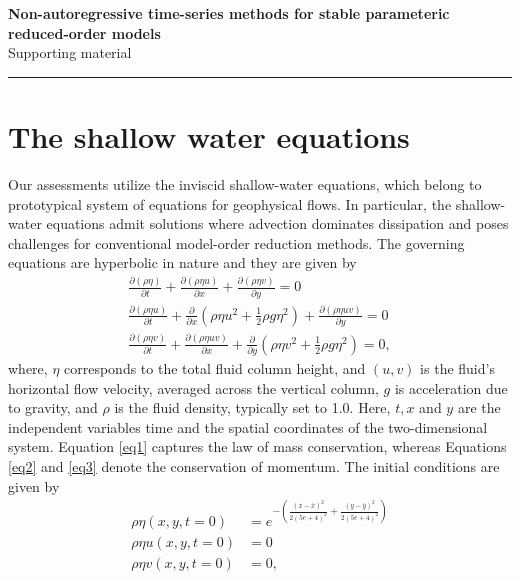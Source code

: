 \documentclass[12pt]{article}
\newcommand{\soptitle}{Non-autoregressive time-series methods for stable parameteric reduced-order models}
\newcommand{\yourname}{Supporting material}
\begin{document}
\begin{center}
\large
\textbf{
\soptitle} \\
\normalsize
\yourname
\end{center}

\hrule

\bigskip

\section{The shallow water equations}

Our assessments utilize the inviscid shallow-water equations, which belong to prototypical system of equations for geophysical flows. In particular, the shallow-water equations admit solutions where advection dominates dissipation and poses challenges for conventional model-order reduction methods. The governing equations are hyperbolic in nature and they are given by
\begin{align}
    \frac{\partial(\rho \eta)}{\partial t}+\frac{\partial(\rho \eta u)}{\partial x}+\frac{\partial(\rho \eta v)}{\partial y} =0  \label{eq1} \\
    \frac{\partial(\rho \eta u)}{\partial t}+\frac{\partial}{\partial x}\left(\rho \eta u^{2}+\frac{1}{2} \rho g \eta^{2}\right)+\frac{\partial(\rho \eta u v)}{\partial y} = 0 \label{eq2} \\
    \frac{\partial(\rho \eta v)}{\partial t}+\frac{\partial(\rho \eta u v)}{\partial x}+\frac{\partial}{\partial y}\left(\rho \eta v^{2}+\frac{1}{2} \rho g \eta^{2}\right) = 0, \label{eq3}
\end{align}
where, $\eta$ corresponds to the total fluid column height, and $(u,v)$ is the fluid's horizontal flow velocity, averaged across the vertical column, $g$ is acceleration due to gravity, and $\rho$ is the fluid density, typically set to 1.0. Here, $t,x$ and $y$ are the independent variables time and the spatial coordinates of the two-dimensional system. Equation \ref{eq1} captures the law of mass conservation, whereas Equations \ref{eq2} and \ref{eq3} denote the conservation of momentum. The initial conditions are given by 
\begin{align}
    \rho \eta (x,y,t=0) &= e^{-\left(\frac{(x-\bar{x})^2}{2(5e+4)^2} + \frac{(y-\bar{y})^2}{2(5e+4)^2}\right)} \\
    \rho \eta u(x,y,t=0) &= 0 \\
    \rho \eta v(x,y,t=0) &= 0,
\end{align}
\end{document}
